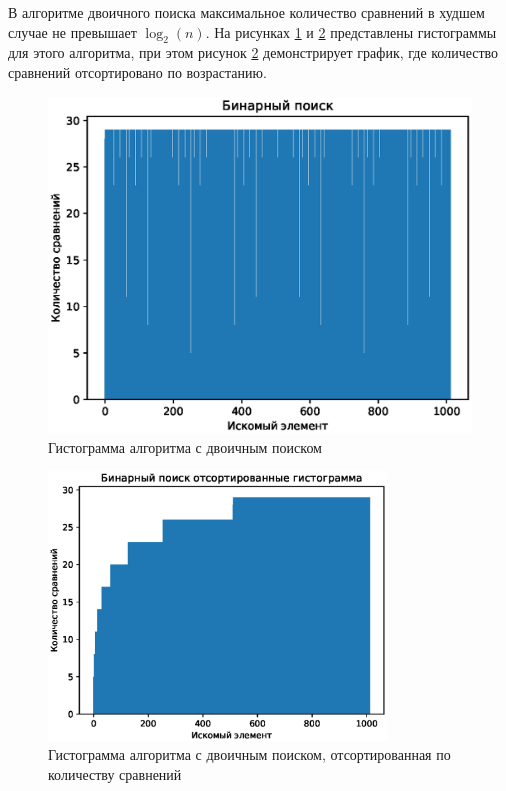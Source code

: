 \clearpage

В алгоритме двоичного поиска максимальное количество сравнений в худшем случае не превышает $\log_2(n)$. На рисунках \ref{fig:Gist_Binary} и \ref{fig:Gist_Binary_Sort} представлены гистограммы для этого алгоритма, при этом рисунок \ref{fig:Gist_Binary_Sort} демонстрирует график, где количество сравнений отсортировано по возрастанию.

\begin{figure}[h]
    \centering
    \includegraphics[scale=1]{img/Figure_2.eps}
    \caption{Гистограмма алгоритма с двоичным поиском}
    \label{fig:Gist_Binary}
\end{figure}

\clearpage
\begin{figure}[h]
    \centering
    \includegraphics[width=0.8\textwidth]{img/Figure_3.eps}
    \caption{Гистограмма алгоритма с двоичным поиском, отсортированная по количеству сравнений}
    \label{fig:Gist_Binary_Sort}
\end{figure}

